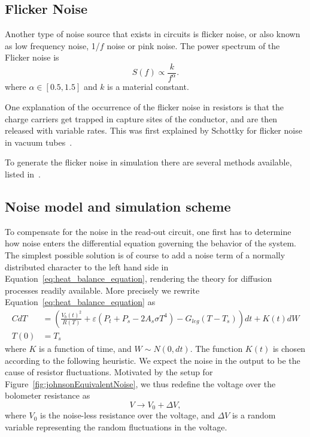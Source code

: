 \subsection{Flicker Noise}

Another type of noise source that exists in circuits is flicker
noise, or also known as low frequency noise, 1/$f$ noise or pink noise. The power
spectrum of the Flicker noise is
\begin{equation}
  \label{eq:power_spectrum_flicker_noise}
  S(f) \propto \frac{k}{f^{\alpha}}.
\end{equation}
where $\alpha \in [0.5, 1.5]$ and $k$ is a material constant.

One explanation of the occurrence of the flicker noise in resistors is
that the charge carriers get trapped in capture sites of the
conductor, and are then released with variable rates. This was first
explained by Schottky for flicker noise in vacuum tubes~\cite{PhysRev.28.74}.

To generate the flicker noise in simulation there are several methods
available, listed in~\cite{381848}.

\subsection{Noise model and simulation scheme}

To compensate for the noise in the read-out circuit, one first has to
determine how noise enters the differential equation governing the
behavior of the system. The simplest possible solution is of course to
add a noise term of a normally distributed character to the left hand side
in Equation~\eqref{eq:heat_balance_equation}, rendering the theory for
diffusion processes readily available. More precisely we rewrite Equation~\eqref{eq:heat_balance_equation}
as
\begin{align} \label{eq:heat_balance_equation_noise1}
 CdT&=\left(\frac{V_b(t)^2}{R(T)}+\varepsilon(P_t+P_s -2A_s \sigma
      T^4)-G_{leg}(T-T_s)
      \right)dt + K(t)dW \\
 T(0)&=T_s	\nonumber
\end{align}
where $K$ is a function of time, and $W \sim N(0, dt)$.
The function $K(t)$ is chosen according to the following heuristic.
We expect the noise in the output to be the cause of resistor fluctuations.
Motivated by the setup for Figure~\ref{fig:johnsonEquivalentNoise}, we thus redefine the voltage over
the bolometer resistance as
\begin{equation}
  \label{eq:randomvariable_transformation}
  V \rightarrow V_0 + \Delta V,
\end{equation}
where $V_0$ is the noise-less resistance over the voltage, and $\Delta
V$ is a random variable representing the random fluctuations in the
voltage.

